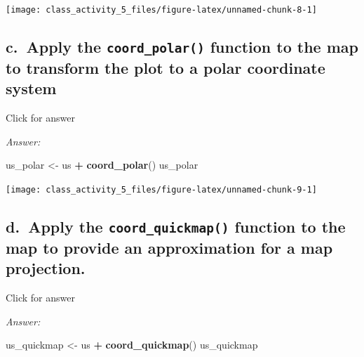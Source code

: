 \documentclass[
]{book}
\newenvironment{Shaded}{\begin{snugshade}}{\end{snugshade}}
\newcommand{\FunctionTok}[1]{\textcolor[rgb]{0.13,0.29,0.53}{\textbf{#1}}}
\newcommand{\NormalTok}[1]{#1}
\newcommand{\OtherTok}[1]{\textcolor[rgb]{0.56,0.35,0.01}{#1}}
\newcommand{\SpecialCharTok}[1]{\textcolor[rgb]{0.81,0.36,0.00}{\textbf{#1}}}
\begin{document}
\texttt{[image: class\_activity\_5\_files/figure-latex/unnamed-chunk-8-1]}

\hypertarget{c.-apply-the-coord_polar-function-to-the-map-to-transform-the-plot-to-a-polar-coordinate-system}{%
\subsection{\texorpdfstring{c.~Apply the \texttt{coord\_polar()} function to the map to transform the plot to a polar coordinate system}{c.~Apply the coord\_polar() function to the map to transform the plot to a polar coordinate system}}\label{c.-apply-the-coord_polar-function-to-the-map-to-transform-the-plot-to-a-polar-coordinate-system}}

Click for answer

\emph{Answer:}

\begin{Shaded}
\begin{Highlighting}[]
\NormalTok{us\_polar }\OtherTok{\textless{}{-}}\NormalTok{ us }\SpecialCharTok{+} \FunctionTok{coord\_polar}\NormalTok{()}
\NormalTok{us\_polar}
\end{Highlighting}
\end{Shaded}

\texttt{[image: class\_activity\_5\_files/figure-latex/unnamed-chunk-9-1]}

\hypertarget{d.-apply-the-coord_quickmap-function-to-the-map-to-provide-an-approximation-for-a-map-projection.}{%
\subsection{\texorpdfstring{d.~Apply the \texttt{coord\_quickmap()} function to the map to provide an approximation for a map projection.}{d.~Apply the coord\_quickmap() function to the map to provide an approximation for a map projection.}}\label{d.-apply-the-coord_quickmap-function-to-the-map-to-provide-an-approximation-for-a-map-projection.}}

Click for answer

\emph{Answer:}

\begin{Shaded}
\begin{Highlighting}[]
\NormalTok{us\_quickmap }\OtherTok{\textless{}{-}}\NormalTok{ us }\SpecialCharTok{+} \FunctionTok{coord\_quickmap}\NormalTok{()}
\NormalTok{us\_quickmap}
\end{Highlighting}
\end{Shaded}
\end{document}
